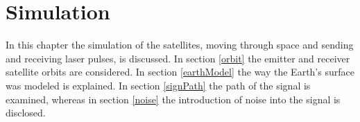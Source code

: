 \chapter{Simulation}
\label{simulation}
In this chapter the simulation of the satellites, moving through space and sending and receiving laser pulses, is discussed. In section \ref{orbit} the emitter and receiver satellite orbits are considered. In section \ref{earthModel} the way the Earth's surface was modeled is explained. In section \ref{signPath} the path of the signal is examined, whereas in section \ref{noise} the introduction of noise into the signal is disclosed.